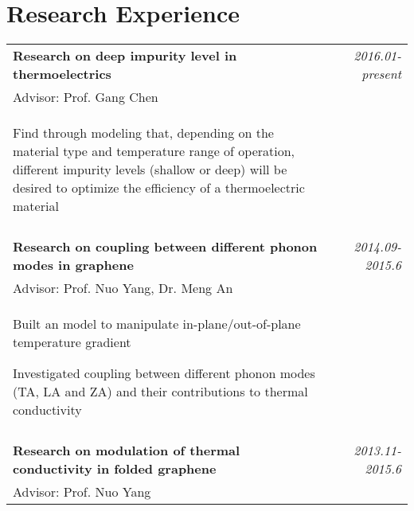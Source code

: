 \documentclass[a4paper,10pt]{article}
\begin{document}
\section{Research Experience}
\begin{tabular}{p{13.5cm}p{0.5cm}r}
\textbf{Research on deep impurity level in thermoelectrics} && \emph{2016.01-present} \\
\hspace{1em} Advisor: Prof. Gang Chen  \hspace{3em}  && \vspace{-0.5em}\\
\begin{compactitem}
\item Find through modeling that, depending on the material type and temperature range of operation, different impurity levels (shallow or deep) will be desired to optimize the efficiency of a thermoelectric material
\end{compactitem}&&\vspace{-2.2em} \\
\multicolumn{3}{c}{} \\
\textbf{Research on coupling between different phonon modes in graphene} && \emph{2014.09-2015.6} \\
\hspace{1em} Advisor: Prof. Nuo Yang, Dr. Meng An \hspace{3em}  && \vspace{-0.5em}\\
\begin{compactitem}
       \item Built an model to manipulate in-plane/out-of-plane temperature gradient\vspace{0.2em}
       \item Investigated coupling between different phonon modes (TA, LA and ZA) and their contributions to thermal conductivity\vspace{0.2em}
     \end{compactitem}&&\vspace{-2.2em} \\
\multicolumn{3}{c}{} \\
\textbf{Research on modulation of thermal conductivity in folded graphene} && \emph{2013.11-2015.6} \\
\hspace{1em} Advisor: Prof. Nuo Yang \hspace{9em} && \vspace{-0.5em}\\

\end{tabular}
\end{document}
